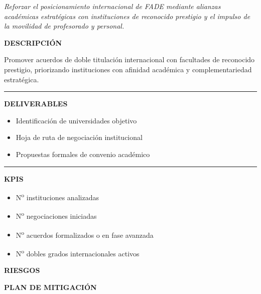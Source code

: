 \documentclass[11pt,a4paper]{scrreprt}
\newcommand{\fieldlabel}[1]{%
  {\footnotesize\sffamily\bfseries\color{mutedcolor}\MakeUppercase{#1}}\par\nopagebreak[4]
}
\newcommand{\fieldsep}{\vspace{3pt}\noindent\textcolor{bordercolor}{\rule{\linewidth}{0.4pt}}\vspace{3pt}\par}
\begin{document}
\newpage
{}
{\small\color{mutedcolor}\itshape Reforzar el posicionamiento internacional de FADE mediante alianzas académicas estratégicas con instituciones de reconocido prestigio y el impulso de la movilidad de profesorado y personal.}\par\vspace{6pt}

\begin{tcolorbox}[pabox={fgcolor}{PA5.1 \enspace\textbullet\enspace Impulsar acuerdos de dobles grados internacionales con facultades de reconocido prestigio}]

\fieldlabel{Descripci\'on}
{\small Promover acuerdos de doble titulación internacional con facultades de reconocido prestigio, priorizando instituciones con afinidad académica y complementariedad estratégica.}\par
\fieldsep
\fieldlabel{Deliverables}
{\small \begin{itemize}[noitemsep,topsep=2pt]
\item Identificación de universidades objetivo
\item Hoja de ruta de negociación institucional
\item Propuestas formales de convenio académico
\end{itemize}}\par
\fieldsep
\fieldlabel{KPIs}
{\small \begin{itemize}[noitemsep,topsep=2pt]
\item N\textsuperscript{o} instituciones analizadas
\item N\textsuperscript{o} negociaciones iniciadas
\item N\textsuperscript{o} acuerdos formalizados o en fase avanzada
\item N\textsuperscript{o} dobles grados internacionales activos
\end{itemize}}\par
\end{tcolorbox}
\begin{tcolorbox}[riskbox]
{\footnotesize\sffamily\bfseries\color{red!50!black} RIESGOS}\par{}
\end{tcolorbox}
\begin{tcolorbox}[mitbox]
{\footnotesize\sffamily\bfseries\color{green!40!black} PLAN DE MITIGACI\'ON}\par{}
\end{tcolorbox}
\vspace{8pt}
\end{document}
